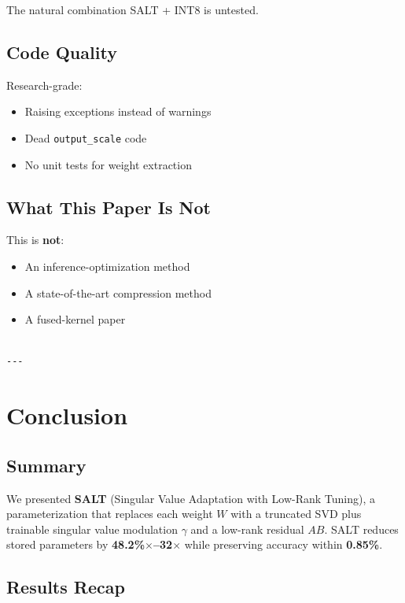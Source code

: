 The natural combination SALT + INT8 is untested.

\subsection{Code Quality}

Research-grade:
\begin{itemize}
\item Raising exceptions instead of warnings
\item Dead \texttt{output\_scale} code
\item No unit tests for weight extraction

\end{itemize}
\subsection{What This Paper Is Not}

This is \textbf{not}:
\begin{itemize}
\item An inference-optimization method
\item A state-of-the-art compression method
\item A fused-kernel paper
\end{itemize}
\begin{lstlisting}

---
\end{lstlisting}


\section{Conclusion}

\subsection{Summary}

We presented \textbf{SALT} (Singular Value Adaptation with Low-Rank Tuning), a 
parameterization that replaces each weight $W$ with a truncated SVD plus 
trainable singular value modulation $\gamma$ and a low-rank residual $AB$. 
SALT reduces stored parameters by \textbf{48.2\%$\times$--32$\times$} 
while preserving accuracy within \textbf{0.85\%}.

\subsection{Results Recap}

